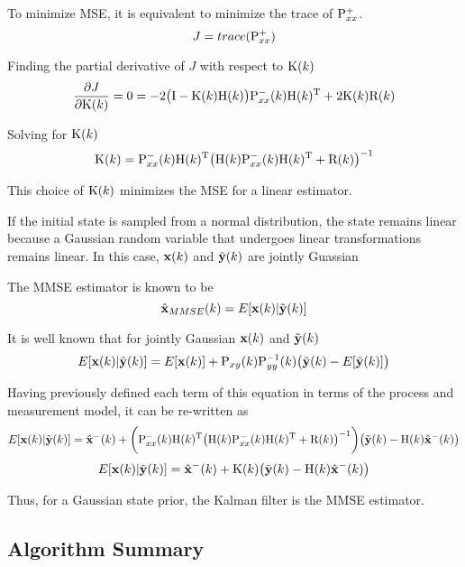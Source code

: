 To minimize MSE, it is equivalent to minimize the trace of $\Pxx\post$.
\begin{equation}
J=trace(\Pxx\post)
\end{equation}

Finding the partial derivative of $ J $ with respect to $ \Kk $
\begin{equation}
\frac{\partial J}{\partial \Kk} = 0 = -2\terma \Pxx\prior\k\Hk\trans+2\Kk\Rk
\end{equation}

Solving for $\Kk$
\begin{equation}
\Kk =\Pxx\prior\k\Hk\trans\big(\Hk\Pxx\prior\k\Hk\trans+\Rk\big)^{-1} 
\end{equation}

This choice of $\Kk $ minimizes the MSE for a linear estimator.


If the initial state is sampled from a normal distribution, the state remains linear because a Gaussian random variable that undergoes linear transformations remains linear. 
In this case, $\xk$ and $\yktilde$ are jointly Guassian

The MMSE estimator is known to be 
\begin{equation}
\xhat_{MMSE}\k=E[\xk|\yktilde]
\end{equation}

It is well known that for jointly Gaussian $ \xk $ and $ \yktilde $ 
\begin{equation}
E[\xk|\yktilde]=E[\xk]+\Pxy\k\Pyy^{-1}\k\big(\yktilde-E[\yktilde]\big)
\end{equation}

Having previously defined each term of this equation in terms of the process and measurement model, it can be re-written as 
\begin{equation}
E[\xk|\yktilde]=\xprior\k+\bigg(\Pxx\prior\k\Hk\trans\big(\Hk\Pxx\prior\k\Hk\trans+\Rk\big)^{-1}\bigg) \big(\yktilde-\Hk\xprior\k\big)
\end{equation}
\begin{equation}
E[\xk|\yktilde]=\xprior\k+\Kk \big(\yktilde-\Hk\xprior\k\big)
\end{equation}

Thus, for a Gaussian state prior, the Kalman filter is the MMSE estimator. 

\subsection{Algorithm Summary}

